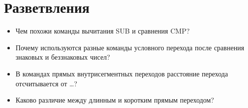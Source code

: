 \chapter{Разветвления}
\begin{itemize}
\item Чем похожи команды вычитания SUB и сравнения CMP?
\item Почему используются разные команды условного перехода после сравнения знаковых и беззнаковых чисел?
\item В командах прямых внутрисегментных переходов расстояние перехода отсчитывается от \dots ?
\item Каково различие между длинным и коротким прямым переходом?
\end{itemize}
\endinput